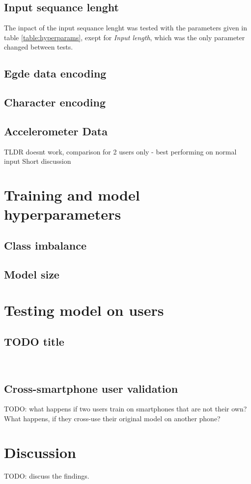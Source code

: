 \subsection{Input sequance lenght}
The inpact of the input sequance lenght was tested with the parameters given in table \ref{table:hyperparams}, exept for \textit{Input length}, which was the only parameter changed between tests.



\subsection{Egde data encoding}

\subsection{Character encoding}

\subsection{Accelerometer Data}
TLDR doesnt work, comparison for 2 users only - best performing on normal input
Short discussion

\section{Training and model hyperparameters}

\subsection{Class imbalance}

\subsection{Model size}


\section{Testing model on users}

\subsection{TODO title}
\\

\subsection{Cross-smartphone user validation}
TODO: what happens if two users train on smartphones that are not their own? What happens, if they cross-use their original model on another phone?

\section{Discussion}
TODO: discuss the findings.